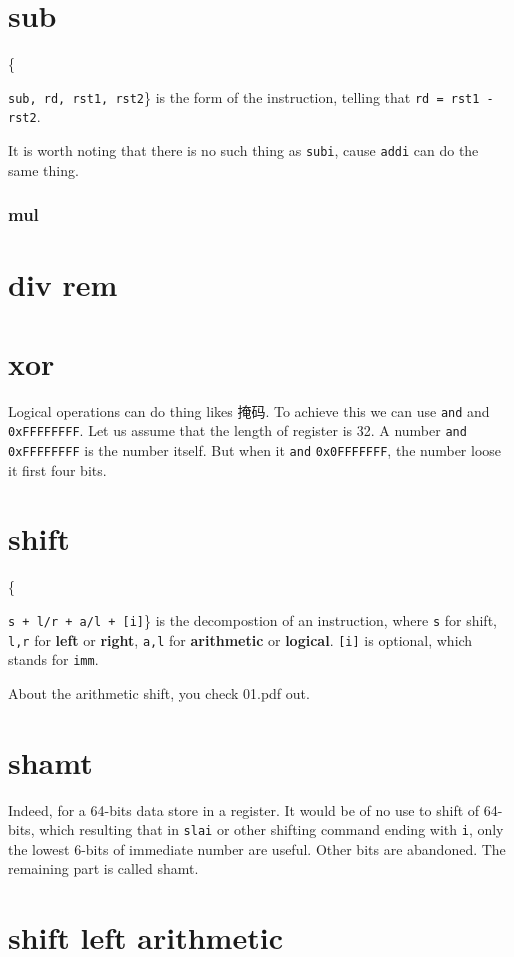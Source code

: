 \documentclass[11pt]{article}
\begin{document}
\section{sub}
\label{sec:org7352b56}
\centerline\{\texttt{sub, rd, rst1, rst2}\}
is the form of the instruction, telling that \texttt{rd = rst1 - rst2}. 

It is worth noting that there is no such thing as \texttt{subi}, cause \texttt{addi} can do the same thing.
\subsubsection{mul}
\section{div rem}
\label{sec:orgddcd71a}
\section{xor}
\label{sec:org96a1db5}
Logical operations can do thing likes 掩码. To achieve this we can use \texttt{and} and \texttt{0xFFFFFFFF}. Let us assume that the length of register is 32. A number \texttt{and} \texttt{0xFFFFFFFF} is the number itself. But when it \texttt{and} \texttt{0x0FFFFFFF}, the number loose it first four bits.

\section{shift}
\label{sec:orge0f4bab}
\centerline\{\texttt{s + l/r + a/l + [i]}\}
is the decompostion of an instruction,
where \texttt{s} for shift, \texttt{l,r} for \textbf{left} or \textbf{right}, \texttt{a,l} for \textbf{arithmetic} or \textbf{logical}. \texttt{[i]} is optional, which stands for \texttt{imm}.

About the arithmetic shift, you check 01.pdf out.

\section{shamt}
\label{sec:orgf531c41}
Indeed, for a 64-bits data store in a register. It would be of no use to shift of 64-bits, which resulting that in \texttt{slai} or other shifting command ending with \texttt{i}, only the lowest 6-bits of immediate number are useful. Other bits are abandoned. The remaining part is called shamt. 

\section{shift left arithmetic}
\label{sec:orgf083de1}
\end{document}
